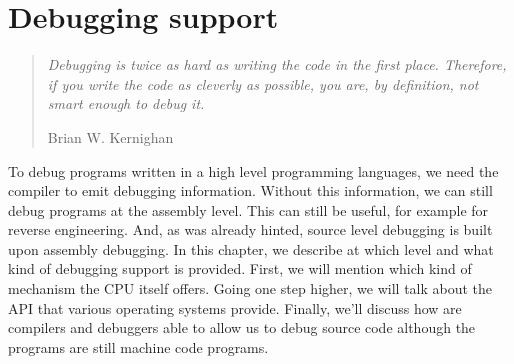\chapter{Debugging support}

\begin{quote}
  \textit{Debugging is twice as hard as writing the code in the first place.
    Therefore, if you write the code as cleverly as possible, you are, by
    definition, not smart enough to debug it.}\begin{flushright}
    \scriptsize{Brian W. Kernighan}
  \end{flushright}
\end{quote}

To debug programs written in a high level programming languages, we need the
compiler to emit debugging information. Without this information, we can still
debug programs at the assembly level. This can still be useful, for example for
reverse engineering. And, as was already hinted, source level debugging is
built upon assembly debugging. In this chapter, we describe at which level and
what kind of debugging support is provided. First, we will mention which kind
of mechanism the CPU itself offers. Going one step higher, we will talk about
the API that various operating systems provide. Finally, we'll discuss how are
compilers and debuggers able to allow us to debug source code although the
programs are still machine code programs. 

